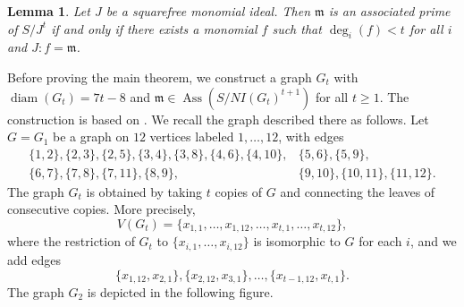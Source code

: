 \documentclass[12pt,reqno,twoside]{amsart}
\newcommand{\mm}{\mathfrak m}
\DeclareMathOperator{\diam}{diam}
\DeclareMathOperator{\Ass}{Ass}
\newtheorem{lem}[thm]{\bf Lemma}
\theoremstyle{definition}
\theoremstyle{plain}
\theoremstyle{remark}
\numberwithin{equation}{section}
\begin{document}
\begin{lem}\label{lem_quotient}
Let $J$ be a squarefree monomial ideal. Then $\mm$ is an associated prime of $S/J^t$ if and only if there exists a monomial $f$ such that $\deg_i(f) < t$ for all $i$ and $J : f = \mm$.
\end{lem}

Before proving the main theorem, we construct a graph $G_t$ with $\diam(G_t) = 7t - 8$ and $\mm \in \Ass(S/NI(G_t)^{t+1})$ for all $t \ge 1$. The construction is based on \cite[Example 2.10]{HV}. We recall the graph described there as follows. Let $G = G_1$ be a graph on $12$ vertices labeled $1, \ldots, 12$, with edges 
\begin{align*}
\{1,2\},\{2,3\},\{2,5\},\{3,4\},\{3,8\},\{4,6\},\{4,10\},&\{5,6\},\{5,9\},\\
\{6,7\},\{7,8\},\{7,11\},\{8,9\},&\{9,10\},\{10,11\},\{11,12\}.
\end{align*}
The graph $G_t$ is obtained by taking $t$ copies of $G$ and connecting the leaves of consecutive copies. More precisely,
\[
V(G_t) = \{x_{1,1}, \ldots, x_{1,12}, \ldots, x_{t,1}, \ldots, x_{t,12}\},
\]
where the restriction of $G_t$ to $\{x_{i,1}, \ldots, x_{i,12}\}$ is isomorphic to $G$ for each $i$, and we add edges 
\[
\{x_{1,12}, x_{2,1}\}, \{x_{2,12}, x_{3,1}\}, \ldots, \{x_{t-1,12}, x_{t,1}\}.
\]
The graph $G_2$ is depicted in the following figure.
\end{document}
